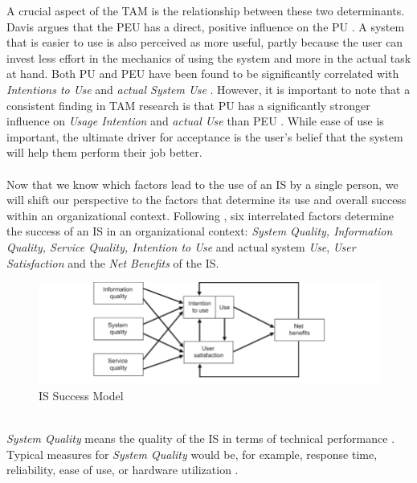 \documentclass[
	english,
	ruledheaders=section,%
	class=report,%
	thesis={type=bachelor},%
	accentcolor=1b,%
	custommargins=true,%
	marginpar=false,%
	parskip=half-,%
	fontsize=11pt,%
	DIV=14,
]{tudapub}
\begin{document}
A crucial aspect of the TAM is the relationship between these two determinants. Davis argues that the PEU has a direct, positive influence on the PU \parencite[p.~334]{Davis1989}. A system that is easier to use is also perceived as more useful, partly because the user can invest less effort in the mechanics of using the system and more in the actual task at hand. Both PU and PEU have been found to be significantly correlated with \textit{Intentions to Use} and \textit{actual System Use} \parencite[p.~333]{Davis1989}. However, it is important to note that a consistent finding in TAM research is that PU has a significantly stronger influence on \textit{Usage Intention} and \textit{actual Use} than PEU \parencite[p.~333]{Davis1989}. While ease of use is important, the ultimate driver for acceptance is the user's belief that the system will help them perform their job better.\\
\\
Now that we know which factors lead to the use of an IS by a single person, we will shift our perspective to the factors that determine its use and overall success within an organizational context.
Following \cite{DeloneMcLean2003ISSuccessTenYearUpdate}, six interrelated factors determine the success of an IS in an organizational context: \textit{System Quality, Information Quality, Service Quality, Intention to Use} and actual system \textit{Use}, \textit{User Satisfaction} and the \textit{Net Benefits} of the IS.\\
\begin{figure}[h!]
    \includegraphics[width=1\linewidth]{images/ISSuccess.png}
    \caption{IS Success Model \parencite[p.~24]{DeloneMcLean2003ISSuccessTenYearUpdate}}
    \label{fig:enter-label}
\end{figure}
\\
\textit{System Quality} means the quality of the IS in terms of technical performance \parencite[p.~64]{DeloneMcLean2003ISSuccessTenYearUpdate}. Typical measures for \textit{System Quality} would be, for example, response time, reliability, ease of use, or hardware utilization \parencite[p.~64--65]{DeloneMcLean1992ISSuccess}.\\
\end{document}

